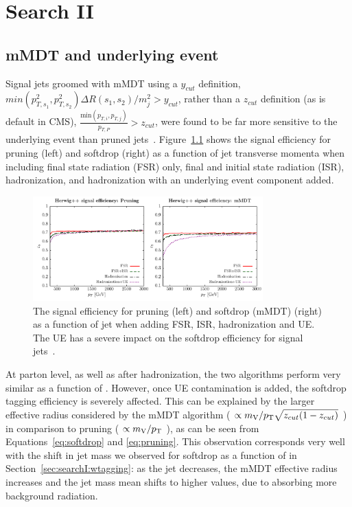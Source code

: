 \clearpage

\chapter{Search II}
\vspace*{\fill}\newpage
\section{mMDT and underlying event}
\label{app:sdue}
Signal jets groomed with mMDT using a $y_{cut}$ definition, $min(p^2_{T,s_1}, p^2_{T,s_2})\Delta R(s_1,s_2)/m^2_{j} > y_{cut}$, rather than a $z_{cut}$ definition (as is default in CMS), $\frac{ \textrm{min}(p_{T,i},p_{T,j}) }{ p_{T,P} } > z_{cut} $, were found to be far more sensitive to the underlying event than pruned jets~\cite{Dasgupta:2015yua}. Figure~\ref{fig:searchII:ue} shows the signal efficiency for pruning (left) and softdrop (right) as a function of jet transverse momenta when including final state radiation (FSR) only, final and initial state radiation (ISR), hadronization, and hadronization with an underlying event component added.
\begin{figure}[h!]
\centering
\includegraphics[width=0.79\textwidth]{figures/analysis/search2/misc/pruningvssd_ue.pdf}
\caption{The signal efficiency for pruning (left) and softdrop (mMDT) (right) as a function of jet \PT when adding FSR, ISR, hadronization and UE. The UE has a severe impact on the softdrop efficiency for signal jets~\cite{Dasgupta:2015yua}. }
\label{fig:searchII:ue}
\end{figure}
At parton level, as well as after hadronization, the two algorithms perform very similar as a function of \PT. However, once UE contamination is added, the softdrop tagging efficiency is severely affected. This can be explained by the larger effective radius considered by the mMDT algorithm ( $\propto m_{\mathrm{V}}/p_{\mathrm{T}} \sqrt{z_{cut}(1-z_{cut})}$ ) in comparison to pruning ( $\propto m_{\mathrm{V}}/p_{\mathrm{T}}$ ), as can be seen from Equations~\ref{eq:softdrop} and \ref{eq:pruning}. This observation corresponds very well with the shift in jet mass we observed for softdrop as a function of \PT in Section~\ref{sec:searchI:wtagging}: as the jet \PT decreases, the mMDT effective radius increases and the jet mass mean shifts to higher values, due to absorbing more background radiation.
\clearpage
